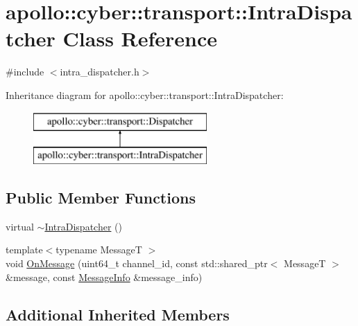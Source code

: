 \hypertarget{classapollo_1_1cyber_1_1transport_1_1IntraDispatcher}{\section{apollo\-:\-:cyber\-:\-:transport\-:\-:Intra\-Dispatcher Class Reference}
\label{classapollo_1_1cyber_1_1transport_1_1IntraDispatcher}
}


{\ttfamily \#include $<$intra\-\_\-dispatcher.\-h$>$}

Inheritance diagram for apollo\-:\-:cyber\-:\-:transport\-:\-:Intra\-Dispatcher\-:\begin{figure}[H]
\begin{center}
\leavevmode
\includegraphics[height=2.000000cm]{classapollo_1_1cyber_1_1transport_1_1IntraDispatcher}
\end{center}
\end{figure}
\subsection*{Public Member Functions}
\begin{DoxyCompactItemize}
\item 
virtual \hyperlink{classapollo_1_1cyber_1_1transport_1_1IntraDispatcher_a2eee7291beff361006efd6d3dbfb26c5}{$\sim$\-Intra\-Dispatcher} ()
\item 
{\footnotesize template$<$typename Message\-T $>$ }\\void \hyperlink{classapollo_1_1cyber_1_1transport_1_1IntraDispatcher_a458c68701438bdcb83c3c7745200201f}{On\-Message} (uint64\-\_\-t channel\-\_\-id, const std\-::shared\-\_\-ptr$<$ Message\-T $>$ \&message, const \hyperlink{classapollo_1_1cyber_1_1transport_1_1MessageInfo}{Message\-Info} \&message\-\_\-info)
\end{DoxyCompactItemize}
\subsection*{Additional Inherited Members}


